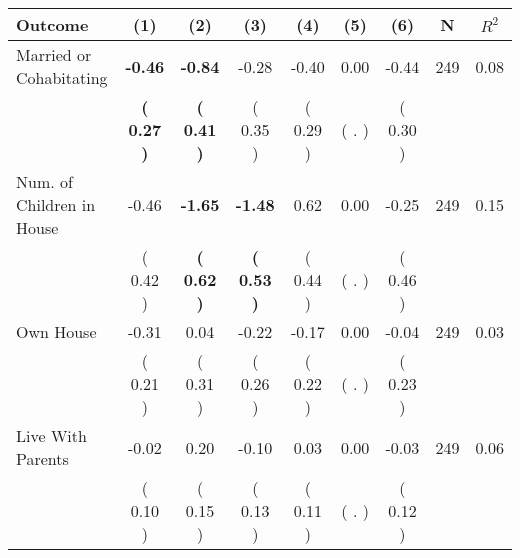 \begin{tabular}{lcccccccc}
\toprule
 \textbf{Outcome} & \textbf{(1)} & \textbf{(2)} & \textbf{(3)} & \textbf{(4)} & \textbf{(5)} & \textbf{(6)} & \textbf{N} & \textbf{$ R^2$} \\
\midrule
Married or Cohabitating & \textbf{    -0.46} & \textbf{    -0.84} &     -0.28 &     -0.40 &      0.00 &     -0.44 & 249 &       0.08 \\ 
 & \textbf{(     0.27 )} & \textbf{(     0.41 )} & (     0.35 ) & (     0.29 ) & (        . ) & (     0.30 ) & \\
Num. of Children in House &     -0.46 & \textbf{    -1.65} & \textbf{    -1.48} &      0.62 &      0.00 &     -0.25 & 249 &       0.15 \\ 
 & (     0.42 ) & \textbf{(     0.62 )} & \textbf{(     0.53 )} & (     0.44 ) & (        . ) & (     0.46 ) & \\
Own House &     -0.31 &      0.04 &     -0.22 &     -0.17 &      0.00 &     -0.04 & 249 &       0.03 \\ 
 & (     0.21 ) & (     0.31 ) & (     0.26 ) & (     0.22 ) & (        . ) & (     0.23 ) & \\
Live With Parents &     -0.02 &      0.20 &     -0.10 &      0.03 &      0.00 &     -0.03 & 249 &       0.06 \\ 
 & (     0.10 ) & (     0.15 ) & (     0.13 ) & (     0.11 ) & (        . ) & (     0.12 ) & \\
\bottomrule
\end{tabular}
